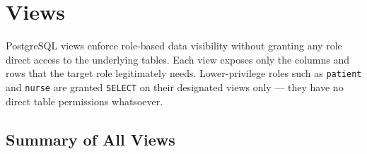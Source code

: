 \documentclass{article}
\begin{document}
\section{Views}

PostgreSQL views enforce role-based data visibility without granting any role direct access to the underlying tables. Each view exposes only the columns and rows that the target role legitimately needs. Lower-privilege roles such as \texttt{patient} and \texttt{nurse} are granted \texttt{SELECT} on their designated views only --- they have no direct table permissions whatsoever.

\subsection{Summary of All Views}
\end{document}
